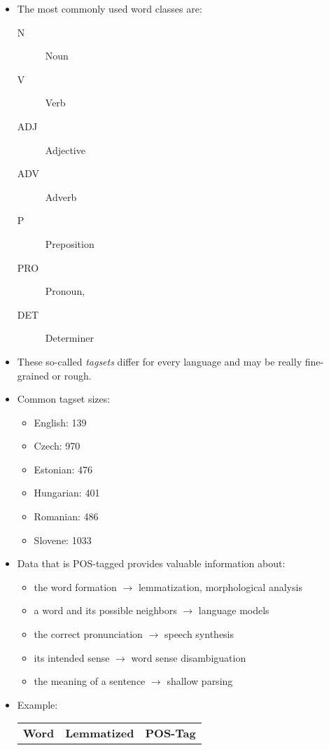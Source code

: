 				\begin{itemize}
					\item The most commonly used word classes are:
						\begin{description}
							\item[N] Noun
							\item[V] Verb
							\item[ADJ] Adjective
							\item[ADV] Adverb
							\item[P] Preposition
							\item[PRO] Pronoun,
							\item[DET] Determiner
						\end{description}
					\item These so-called \textit{tagsets} differ for every language and may be really fine-grained or rough.
					\item Common tagset sizes:
						\begin{itemize}
							\item English: 139
							\item Czech: 970
							\item Estonian: 476
							\item Hungarian: 401
							\item Romanian: 486
							\item Slovene: 1033
						\end{itemize}
					\item Data that is POS-tagged provides valuable information about:
						\begin{itemize}
							\item the word formation \( \rightarrow \) lemmatization, morphological analysis
							\item a word and its possible neighbors \( \rightarrow \) language models
							\item the correct pronunciation \( \rightarrow \) speech synthesis
							\item its intended sense \( \rightarrow \) word sense disambiguation
							\item the meaning of a sentence \( \rightarrow \) shallow parsing
						\end{itemize}
					\item Example:
						\begin{table}[H]
							\centering
							\begin{tabular}{l l l}
								\textbf{Word} & \textbf{Lemmatized} & \textbf{POS-Tag} \\

\end{tabular}
\end{table}
\end{itemize}
